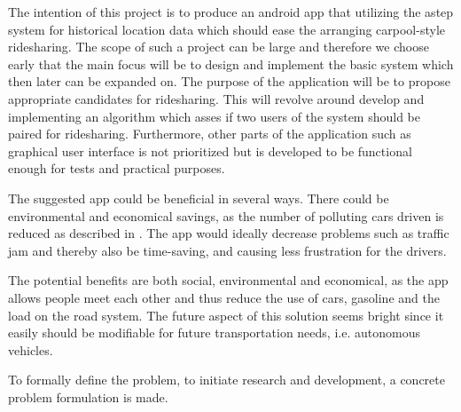 The intention of this project is to produce an android app that utilizing the \gls{astep} system for historical location data which should ease the arranging carpool-style ridesharing.
The scope of such a project can be large and therefore we choose early that the main focus will be to design and implement the basic system which then later can be expanded on.
The purpose of the application will be to propose appropriate candidates for ridesharing.
This will revolve around develop and implementing an algorithm which asses if two users of the system should be paired for ridesharing.
Furthermore, other parts of the application such as graphical user interface is not prioritized but is developed to be functional enough for tests and practical purposes.

The suggested app could be beneficial in several ways.
There could be environmental and economical savings, as the number of polluting cars driven is reduced as described in \cite{doi:10.1080/01441647.2011.621557}.
The app would ideally decrease problems such as traffic jam and thereby also be time-saving, and causing less frustration for the drivers.

The potential benefits are both social, environmental and economical, as the app allows people meet each other and thus reduce the use of cars, gasoline and the load on the road system.
The future aspect of this solution seems bright since it easily should be modifiable for future transportation needs, i.e. autonomous vehicles.

To formally define the problem, to initiate research and development, a concrete problem formulation is made.